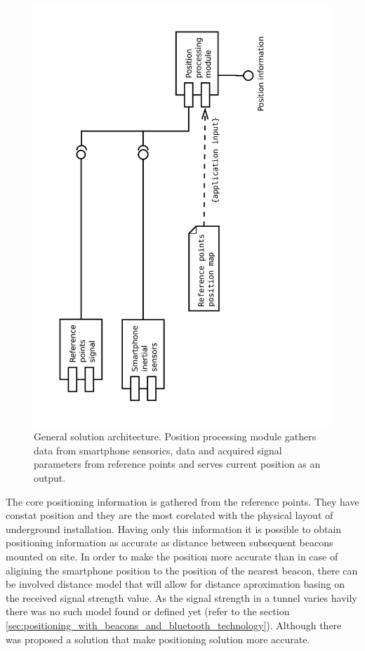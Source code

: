 \documentclass[../main.tex]{subfiles}
\begin{document}
\begin{figure}[!htbp]
\includegraphics[height=\textwidth, angle=270, trim={0 0 4cm 0},clip]{pictures/architecture_general.pdf}
\centering
\caption{General solution architecture. Position processing module gathers data from smartphone sensorics, data and acquired signal parameters from reference points and serves current position as an output.}
\label{fig:architecture_general}
\end{figure}

The core positioning information is gathered from the reference points. They have constat position and they are the most corelated with the physical layout of underground installation. Having only this information it is possible to obtain positioning information as accurate as distance between subsequent beacons mounted on site. In order to make the position more accurate than in case of aligining the smartphone position to the position of the nearest beacon, there can be involved distance model that will allow for distance aproximation basing on the received signal strength value. As the signal strength in a tunnel varies havily there was no such model found or defined yet (refer to the section \ref{sec:positioning_with_beacons_and_bluetooth_technology}). Although there was proposed a solution that make positioning solution more accurate.
\end{document}
